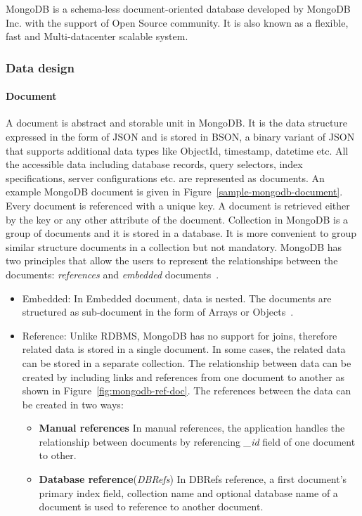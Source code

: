 MongoDB is a schema-less document-oriented database developed by MongoDB Inc. with the support of Open Source community. It is also known as a flexible, fast and Multi-datacenter scalable system.
\subsubsection{Data design} 
\paragraph{Document}
	A document is abstract and storable unit in MongoDB. It is the data structure expressed in the form of JSON and is stored in BSON, a binary variant of JSON that supports additional data types like ObjectId, timestamp, datetime etc. All the accessible data including database records, query selectors, index specifications, server configurations etc. are represented as documents. An example  MongoDB document is given in Figure~\ref{sample-mongodb-document}.
Every document is referenced with a unique key. A document is retrieved either by the key or any other attribute of the document. Collection in MongoDB is a group of documents and it is stored in a database. It is more convenient to group similar structure documents in a collection but not mandatory. MongoDB has two principles that allow the users to represent the relationships between the documents: \textit{references} and \textit{embedded} documents~\citep{mongodb:org}. 
\begin{itemize}
\item {Embedded:}\label{mongo:embedded}
    In Embedded document, data is nested. The documents are structured as sub-document in the form of Arrays or Objects~\citep{nosql/comparision}. 
    \item{Reference:}
    Unlike RDBMS, MongoDB has no support for joins, therefore related data is stored in a single document. In some cases, the related data can be stored in a separate collection. The relationship between data can be created by including links and references from one document to another as shown in Figure~\ref{fig:mongodb-ref-doc}.  The references between the data can be created in two ways:
\begin{itemize}
	\item {\textbf{Manual references}}
		In manual references, the application handles the relationship between documents by referencing \textit{\_id} field of one document to other. 
	\item \textbf{Database reference}(\textit{DBRefs})
	In  DBRefs reference, a first document's primary index field, collection name and optional database name of a document is used to reference to another document.
\end{itemize}



\end{itemize}

